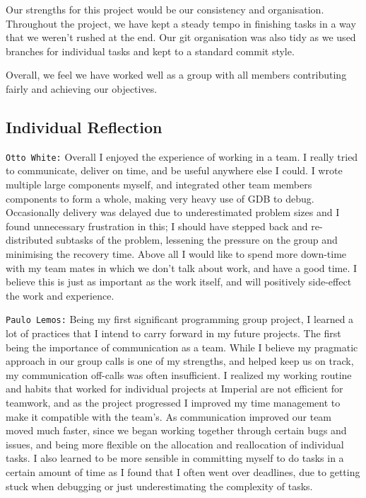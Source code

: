 \documentclass[11pt]{article}
\begin{document}
Our strengths for this project would be our consistency and organisation. Throughout the project, we have kept a steady tempo in finishing tasks in a way that we weren't rushed at the end. Our git organisation was also tidy as we used branches for individual tasks and kept to a standard commit style.

Overall, we feel we have worked well as a group with all members contributing fairly and achieving our objectives.
  \subsection*{Individual Reflection}

\texttt{Otto White:} Overall I enjoyed the experience of working in a team. I really tried to communicate, deliver on time, and be useful anywhere else I could. I wrote multiple large components myself, and integrated other team members components to form a whole, making very heavy use of GDB to debug. Occasionally delivery was delayed due to underestimated problem sizes and I found unnecessary frustration in this; I should have stepped back and re-distributed subtasks of the problem, lessening the pressure on the group and minimising the recovery time. Above all I would like to spend more down-time with my team mates in which we don’t talk about work, and have a good time. I believe this is just as important as the work itself, and will positively side-effect the work and experience.

\texttt{Paulo Lemos:} Being my first significant programming group project, I learned a lot of practices that I intend to carry forward in my future projects. The first being the importance of communication as a team. While I believe my pragmatic approach in our group calls is one of my strengths, and helped keep us on track, my communication off-calls was often insufficient. I realized my working routine and habits that worked for individual projects at Imperial are not efficient for teamwork, and as the project progressed I improved my time management to make it compatible with the team’s. As communication improved our team moved much faster, since we began working together through certain bugs and issues, and being more flexible on the allocation and reallocation of individual tasks. I also learned to be more sensible in committing myself to do tasks in a certain amount of time as I found that I often went over deadlines, due to getting stuck when debugging or just underestimating the complexity of tasks. 
\end{document}
